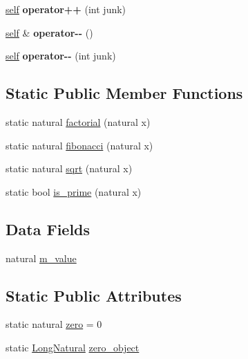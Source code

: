\begin{DoxyCompactItemize}
\mbox{\label{classez_1_1objects_1_1LongNatural_a57bd20a187e5a6a24bc40f28452cc0f8}} 
\hyperlink{classez_1_1objects_1_1LongNatural}{self} {\bfseries operator++} (int junk)
\item 
\mbox{\label{classez_1_1objects_1_1LongNatural_a16bc2c7859534604b781fd1e57b9a47e}} 
\hyperlink{classez_1_1objects_1_1LongNatural}{self} \& {\bfseries operator-\/-\/} ()
\item 
\mbox{\label{classez_1_1objects_1_1LongNatural_a902cc0522b5ef0a8840a5e992b27df5c}} 
\hyperlink{classez_1_1objects_1_1LongNatural}{self} {\bfseries operator-\/-\/} (int junk)
\end{DoxyCompactItemize}
\subsection*{Static Public Member Functions}
\begin{DoxyCompactItemize}
\item 
static natural \hyperlink{classez_1_1objects_1_1LongNatural_ae67669fc6851a64143eeab0bc14deae2}{factorial} (natural x)
\item 
static natural \hyperlink{classez_1_1objects_1_1LongNatural_a40705497507f5ba97adcbd4be3ee9c19}{fibonacci} (natural x)
\item 
static natural \hyperlink{classez_1_1objects_1_1LongNatural_a70ac1efa09825aa1bde059bb176b2cb1}{sqrt} (natural x)
\item 
static bool \hyperlink{classez_1_1objects_1_1LongNatural_a87d9ed5aed5696e77a6776989b39437a}{is\+\_\+prime} (natural x)
\end{DoxyCompactItemize}
\subsection*{Data Fields}
\begin{DoxyCompactItemize}
\item 
natural \hyperlink{classez_1_1objects_1_1LongNatural_a0f7e791901688eb6067b6edb82244989}{m\+\_\+value}
\end{DoxyCompactItemize}
\subsection*{Static Public Attributes}
\begin{DoxyCompactItemize}
\item 
static natural \hyperlink{classez_1_1objects_1_1LongNatural_a86d552aacb841cd40f43da3aa3bb78e3}{zero} = 0
\item 
static \hyperlink{classez_1_1objects_1_1LongNatural}{Long\+Natural} \hyperlink{classez_1_1objects_1_1LongNatural_aac7c3b61859bd9a941b1d408f3e2e67d}{zero\+\_\+object}
\end{DoxyCompactItemize}
